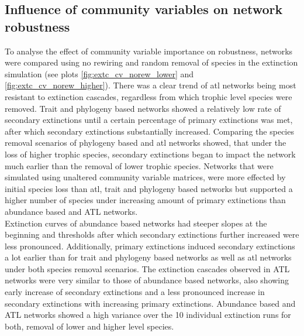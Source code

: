 \documentclass[12pt,a4paper]{article}
\begin{document}
\subsection{Influence of community variables on network robustness}
To analyse the effect of community variable importance on robustness, networks were compared using no rewiring and random removal of species in the extinction simulation (see plots \ref{fig:extc_cv_norew_lower} and \ref{fig:extc_cv_norew_higher}). There was a clear trend of atl networks being most resistant to extinction cascades, regardless from which trophic level species were removed. Trait and phylogeny based networks showed a relatively low rate of secondary extinctions until a certain percentage of primary extinctions was met, after which secondary extinctions substantially increased. Comparing the species removal scenarios of phylogeny based and atl networks showed, that under the loss of higher trophic species, secondary extinctions began to impact the network much earlier than the removal of lower trophic species. Networks that were simulated using unaltered community variable matrices, were more effected by initial species loss than atl, trait and phylogeny based networks but supported a higher number of species under increasing amount of primary extinctions than abundance based and ATL networks.\\
Extinction curves of abundance based networks had steeper slopes at the beginning and thresholds after which secondary extinctions further increased were less pronounced. Additionally, primary extinctions induced secondary extinctions a lot earlier than for trait and phylogeny based networks as well as atl networks under both species removal scenarios. The extinction cascades observed in ATL networks were very similar to those of abundance based networks, also showing early increase of secondary extinctions and a less pronounced increase in secondary extinctions with increasing primary extinctions. Abundance based and ATL networks showed a high variance over the 10 individual extinction runs for both, removal of lower and higher level species. 

\end{document}
